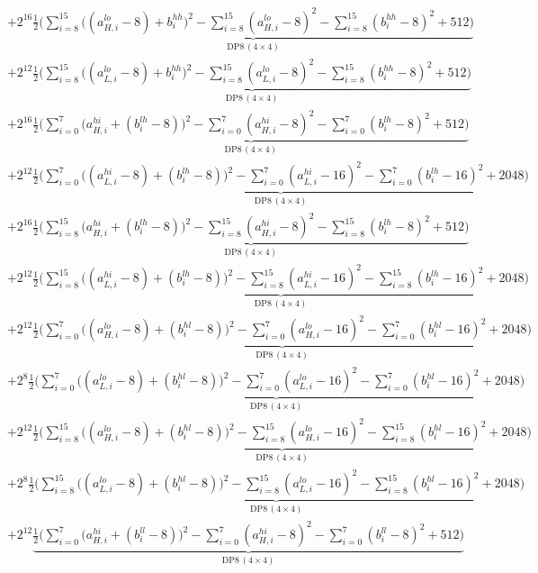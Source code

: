 \documentclass[fleqn]{article}
\newcommand{\DPop}[3]{\mathrm{DP#1}\,(#2\!\times\!#3)}
\begin{document}
{\begin{align*}
  & + 2^{16}\underbrace{\tfrac12\Big(\sum_{i=8}^{15}\big((a_{H,i}^{lo}{-}8){+}b_i^{hh}\big)^2 - \sum_{i=8}^{15}(a_{H,i}^{lo}{-}8)^2 - \sum_{i=8}^{15}(b_i^{hh}{-}8)^2 + 512\Big)}_{\DPop{8}{4}{4}} \\[0.25em]
  & + 2^{12}\underbrace{\tfrac12\Big(\sum_{i=8}^{15}\big((a_{L,i}^{lo}{-}8){+}b_i^{hh}\big)^2 - \sum_{i=8}^{15}(a_{L,i}^{lo}{-}8)^2 - \sum_{i=8}^{15}(b_i^{hh}{-}8)^2 + 512\Big)}_{\DPop{8}{4}{4}} \\[0.25em]
  & + 2^{16}\underbrace{\tfrac12\Big(\sum_{i=0}^{7}\big(a_{H,i}^{hi}{+}(b_i^{lh}{-}8)\big)^2 - \sum_{i=0}^{7}(a_{H,i}^{hi}{-}8)^2 - \sum_{i=0}^{7}(b_i^{lh}{-}8)^2 + 512\Big)}_{\DPop{8}{4}{4}} \\[0.25em]
  & + 2^{12}\underbrace{\tfrac12\Big(\sum_{i=0}^{7}\big((a_{L,i}^{hi}{-}8){+}(b_i^{lh}{-}8)\big)^2 - \sum_{i=0}^{7}(a_{L,i}^{hi}{-}16)^2 - \sum_{i=0}^{7}(b_i^{lh}{-}16)^2 + 2048\Big)}_{\DPop{8}{4}{4}} \\[0.25em]
  & + 2^{16}\underbrace{\tfrac12\Big(\sum_{i=8}^{15}\big(a_{H,i}^{hi}{+}(b_i^{lh}{-}8)\big)^2 - \sum_{i=8}^{15}(a_{H,i}^{hi}{-}8)^2 - \sum_{i=8}^{15}(b_i^{lh}{-}8)^2 + 512\Big)}_{\DPop{8}{4}{4}} \\[0.25em]
  & + 2^{12}\underbrace{\tfrac12\Big(\sum_{i=8}^{15}\big((a_{L,i}^{hi}{-}8){+}(b_i^{lh}{-}8)\big)^2 - \sum_{i=8}^{15}(a_{L,i}^{hi}{-}16)^2 - \sum_{i=8}^{15}(b_i^{lh}{-}16)^2 + 2048\Big)}_{\DPop{8}{4}{4}} \\[0.25em]
  & + 2^{12}\underbrace{\tfrac12\Big(\sum_{i=0}^{7}\big((a_{H,i}^{lo}{-}8){+}(b_i^{hl}{-}8)\big)^2 - \sum_{i=0}^{7}(a_{H,i}^{lo}{-}16)^2 - \sum_{i=0}^{7}(b_i^{hl}{-}16)^2 + 2048\Big)}_{\DPop{8}{4}{4}} \\[0.25em]
  & + 2^{8}\underbrace{\tfrac12\Big(\sum_{i=0}^{7}\big((a_{L,i}^{lo}{-}8){+}(b_i^{hl}{-}8)\big)^2 - \sum_{i=0}^{7}(a_{L,i}^{lo}{-}16)^2 - \sum_{i=0}^{7}(b_i^{hl}{-}16)^2 + 2048\Big)}_{\DPop{8}{4}{4}} \\[0.25em]
  & + 2^{12}\underbrace{\tfrac12\Big(\sum_{i=8}^{15}\big((a_{H,i}^{lo}{-}8){+}(b_i^{hl}{-}8)\big)^2 - \sum_{i=8}^{15}(a_{H,i}^{lo}{-}16)^2 - \sum_{i=8}^{15}(b_i^{hl}{-}16)^2 + 2048\Big)}_{\DPop{8}{4}{4}} \\[0.25em]
  & + 2^{8}\underbrace{\tfrac12\Big(\sum_{i=8}^{15}\big((a_{L,i}^{lo}{-}8){+}(b_i^{hl}{-}8)\big)^2 - \sum_{i=8}^{15}(a_{L,i}^{lo}{-}16)^2 - \sum_{i=8}^{15}(b_i^{hl}{-}16)^2 + 2048\Big)}_{\DPop{8}{4}{4}} \\[0.25em]
  & + 2^{12}\underbrace{\tfrac12\Big(\sum_{i=0}^{7}\big(a_{H,i}^{hi}{+}(b_i^{ll}{-}8)\big)^2 - \sum_{i=0}^{7}(a_{H,i}^{hi}{-}8)^2 - \sum_{i=0}^{7}(b_i^{ll}{-}8)^2 + 512\Big)}_{\DPop{8}{4}{4}} \\[0.25em]

\end{align*}}
\end{document}
